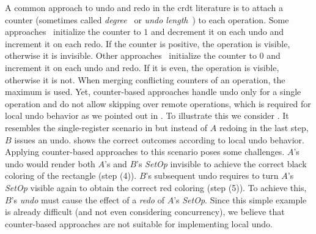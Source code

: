 \documentclass[sigplan,natbib=false,review]{acmart}
\newcommand{\setopkind}{\textit{SetOp}}
\begin{document}
A common approach to undo and redo in the \gls{crdt} literature is
to attach a counter
(sometimes called \emph{degree}~\cite{Weiss2010LogootUndo} or
\emph{undo length}~\cite{Brattli2021undo,Yu2019undo}) to each operation.
Some approaches~\cite{Weiss2010LogootUndo,Martin2010xml} initialize the
counter to $1$ and decrement it on each undo and increment it on each redo.
If the counter is positive, the operation is visible,
otherwise it is invisible.
Other approaches~\cite{Brattli2021undo,Yu2019undo} initialize the counter
to $0$ and increment it on each undo and redo.
If it is even, the operation is visible, otherwise it is not.
When merging conflicting counters of an operation, the maximum is used.
Yet, counter-based approaches handle undo only for a single operation
and do not allow skipping over remote operations, which is required
for local undo behavior as we pointed out in .
To illustrate this we consider .
It resembles the single-register scenario in  but
instead of $A$ redoing in the last step, $B$ issues an undo.
 shows the correct outcomes according to local undo
behavior.
Applying counter-based approaches to this scenario poses some challenges.
$A$'s undo would render both $A$'s and $B$'s \setopkind{} invisible to
achieve the correct black coloring of the rectangle (step (4)).
$B$'s subsequent undo requires to turn $A$'s \setopkind{} visible again to
obtain the correct red coloring (step (5)).
To achieve this, $B$'s \emph{undo} must cause the effect of a \emph{redo}
of $A$'s \setopkind{}.
Since this simple example is already difficult (and not even considering
concurrency), we believe that counter-based approaches are not suitable
for implementing local undo.

\end{document}
